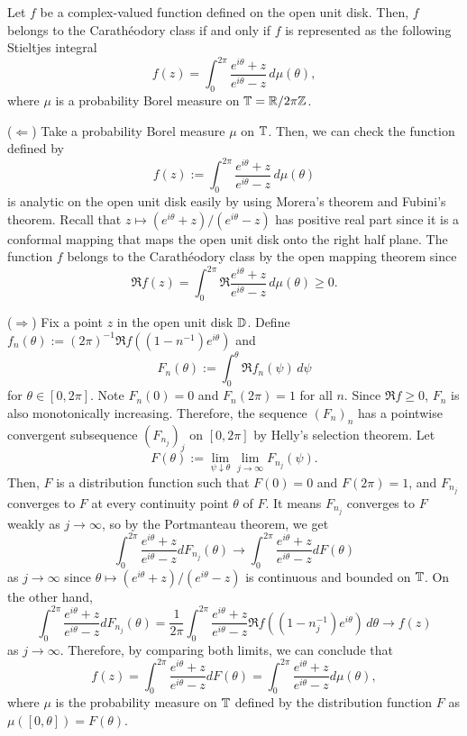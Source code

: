 \documentclass[a4paper]{article}
\begin{document}
\begin{thm}
Let $f$ be a complex-valued function defined on the open unit disk.
Then, $f$ belongs to the Carath\'eodory class if and only if $f$ is represented as the following Stieltjes integral
\[f(z)=\int_0^{2\pi}\frac{e^{i\theta}+z}{e^{i\theta}-z}\,d\mu(\theta),\]
where $\mu$ is a probability Borel measure on $\mathbb{T}=\mathbb{R}/2\pi\mathbb{Z}$.
\end{thm}
\begin{pf}
($\Leftarrow$)
Take a probability Borel measure $\mu$ on $\mathbb{T}$.
Then, we can check the function defined by
\[f(z):=\int_0^{2\pi}\frac{e^{i\theta}+z}{e^{i\theta}-z}\,d\mu(\theta)\]
is analytic on the open unit disk easily by using Morera's theorem and Fubini's theorem.
Recall that $z\mapsto(e^{i\theta}+z)/(e^{i\theta}-z)$ has positive real part since it is a conformal mapping that maps the open unit disk onto the right half plane.
The function $f$ belongs to the Carath\'eodory class by the open mapping theorem since
\[\Re f(z)=\int_0^{2\pi}\Re\frac{e^{i\theta}+z}{e^{i\theta}-z}\,d\mu(\theta)\ge0.\]

($\Rightarrow$)
Fix a point $z$ in the open unit disk $\mathbb{D}$.
Define $f_n(\theta):=(2\pi)^{-1}\Re f((1-n^{-1})e^{i\theta})$ and
\[F_n(\theta):=\int_0^\theta\Re f_n(\psi)\,d\psi\]
for $\theta\in[0,2\pi]$.
Note $F_n(0)=0$ and $F_n(2\pi)=1$ for all $n$.
Since $\Re f\ge0$, $F_n$ is also monotonically increasing.
Therefore, the sequence $(F_n)_n$ has a pointwise convergent subsequence $(F_{n_j})_j$ on $[0,2\pi]$ by Helly's selection theorem.
Let
\[F(\theta):=\lim_{\psi\downarrow\theta}\lim_{j\to\infty}F_{n_j}(\psi).\]
Then, $F$ is a distribution function such that $F(0)=0$ and $F(2\pi)=1$, and $F_{n_j}$ converges to $F$ at every continuity point $\theta$ of $F$.
It means $F_{n_j}$ converges to $F$ weakly as $j\to\infty$, so by the Portmanteau theorem, we get
\[\int_0^{2\pi}\frac{e^{i\theta}+z}{e^{i\theta}-z}dF_{n_j}(\theta)\to\int_0^{2\pi}\frac{e^{i\theta}+z}{e^{i\theta}-z}dF(\theta)\]
as $j\to\infty$ since $\theta\mapsto(e^{i\theta}+z)/(e^{i\theta}-z)$ is continuous and bounded on $\mathbb{T}$.
On the other hand,
\[\int_0^{2\pi}\frac{e^{i\theta}+z}{e^{i\theta}-z}dF_{n_j}(\theta)
=\frac1{2\pi}\int_0^{2\pi}\frac{e^{i\theta}+z}{e^{i\theta}-z}\Re f((1-n_j^{-1})e^{i\theta})\,d\theta\to f(z)\]
as $j\to\infty$.
Therefore, by comparing both limits, we can conclude that
\[f(z)=\int_0^{2\pi}\frac{e^{i\theta}+z}{e^{i\theta}-z}dF(\theta)=\int_0^{2\pi}\frac{e^{i\theta}+z}{e^{i\theta}-z}d\mu(\theta),\]
where $\mu$ is the probability measure on $\mathbb{T}$ defined by the distribution function $F$ as $\mu([0,\theta])=F(\theta)$.
\end{pf}
\end{document}
